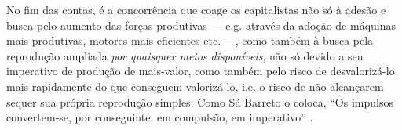 
No fim das contas, é a concorrência que coage os capitalistas não só à adesão e busca pelo aumento das forças produtivas --- e.g. através da adoção de máquinas mais produtivas, motores mais eficientes etc. ---, como também à busca pela reprodução ampliada \textit{por quaisquer meios disponíveis}, não só devido a seu imperativo de produção de mais-valor, como também pelo risco de desvalorizá-lo mais rapidamente do que conseguem valorizá-lo, i.e. o risco de não alcançarem sequer sua própria reprodução simples. Como Sá Barreto o coloca, ``Os impulsos convertem-se, por conseguinte, em compulsão, em imperativo'' \parencite[p. 150]{SaBarreto2018}. 

